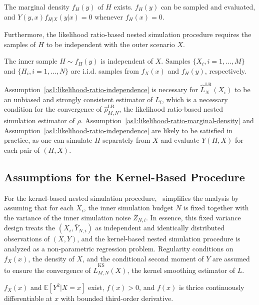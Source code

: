 \begin{assumption} \label{as1:likelihood-ratio-marginal-density}
    The marginal density $f_H(y)$ of $H$ exists. $f_H(y)$ can be sampled and evaluated, and $Y(y, x) f_{H|X}(y|x) = 0$ whenever $f_H(x) = 0$. 
\end{assumption}

Furthermore, the likelihood ratio-based nested simulation procedure requires the samples of $H$ to be independent with the outer scenario $X$.

\begin{assumption} \label{as1:likelihood-ratio-independence}
    The inner sample $H \sim f_H(y)$ is independent of $X$. Samples $\{X_i, i=1,\ldots,M\}$ and $\{H_i, i=1,\ldots,N\}$ are i.i.d. samples from $f_X(x)$ and $f_H(y)$, respectively.
\end{assumption}

Assumption~\ref{as1:likelihood-ratio-independence} is necessary for $\hat{L}^{\text{LR}}_N(X_i)$ to be an unbiased and strongly consistent estimator of $L_i$, which is a necessary condition for the convergence of $\hat{\rho}^{\text{LR}}_{M,N}$, the likelihood ratio-based nested simulation estimator of $\rho$.
Assumption~\ref{as1:likelihood-ratio-marginal-density} and Assumption~\ref{as1:likelihood-ratio-independence} are likely to be satisfied in practice, as one can simulate $H$ separately from $X$ and evaluate $Y(H, X)$ for each pair of $(H, X)$.

\subsection{Assumptions for the Kernel-Based Procedure}
For the kernel-based nested simulation procedure,~\cite{hong2017kernel} simplifies the analysis by assuming that for each $X_i$, the inner simulation budget $N$ is fixed together with the variance of the inner simulation noise $\bar{Z}_{N, i}$.
In essence, this fixed variance design treats the $(X_i, \bar{Y}_{N, i})$ as independent and identically distributed observations of $(X, Y)$, and the kernel-based nested simulation procedure is analyzed as a non-parametric regression problem.
Regularity conditions on $f_X(x)$, the density of $X$, and the conditional second moment of $Y$ are assumed to ensure the convergence of $\hat{L}^{\text{KS}}_{M, N}(X)$, the kernel smoothing estimator of $L$.

\begin{assumption}
    $f_X(x)$ and $\mathbb{E} \left[ Y^2 | X = x \right]$ exist, $f(x) > 0$, and $f(x)$ is thrice continuously differentiable at $x$ with bounded third-order derivative.
\end{assumption}

